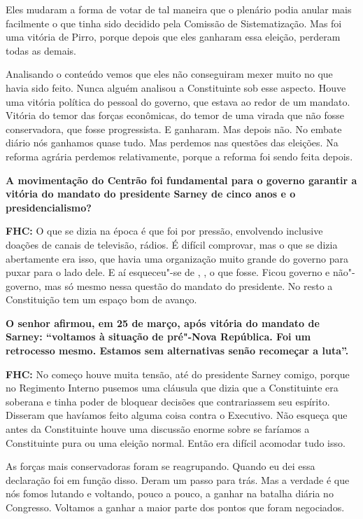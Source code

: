 Eles mudaram a forma de votar de tal maneira que o plenário podia anular
mais facilmente o que tinha sido decidido pela Comissão de
Sistematização. Mas foi uma vitória de Pirro, porque depois que eles
ganharam essa eleição, perderam todas as demais.

Analisando o conteúdo vemos que eles não conseguiram mexer muito no que
havia sido feito. Nunca alguém analisou a Constituinte sob esse aspecto.
Houve uma vitória política do pessoal do governo, que estava ao redor de
um mandato. Vitória do temor das forças econômicas, do temor de uma
virada que não fosse conservadora, que fosse progressista. E ganharam.
Mas depois não. No embate diário nós ganhamos quase tudo. Mas perdemos
nas questões das eleições. Na reforma agrária perdemos relativamente,
porque a reforma foi sendo feita depois.

\textbf{A movimentação do Centrão foi fundamental para o governo
garantir a vitória do mandato do presidente Sarney de cinco anos e o
presidencialismo?}

\textbf{FHC:} O que se dizia na época é que foi por pressão, envolvendo
inclusive doações de canais de televisão, rádios. É difícil comprovar,
mas o que se dizia abertamente era isso, que havia uma organização muito
grande do governo para puxar para o lado dele. E aí esqueceu"-se de ,
, o que fosse. Ficou governo e não"-governo, mas só mesmo nessa
questão do mandato do presidente. No resto a Constituição tem um espaço
bom de avanço.

\textbf{O senhor afirmou, em 25 de março, após vitória do mandato de
Sarney: ``voltamos à situação de pré"-Nova República. Foi um retrocesso
mesmo. Estamos sem alternativas senão recomeçar a luta''.}

\textbf{FHC:} No começo houve muita tensão, até do presidente Sarney
comigo, porque no Regimento Interno pusemos uma cláusula que dizia que a
Constituinte era soberana e tinha poder de bloquear decisões que
contrariassem seu espírito. Disseram que havíamos feito alguma coisa
contra o Executivo. Não esqueça que antes da Constituinte houve uma
discussão enorme sobre se faríamos a Constituinte pura ou uma eleição
normal. Então era difícil acomodar tudo isso.

As forças mais conservadoras foram se reagrupando. Quando eu dei essa
declaração foi em função disso. Deram um passo para trás. Mas a verdade
é que nós fomos lutando e voltando, pouco a pouco, a ganhar na batalha
diária no Congresso. Voltamos a ganhar a maior parte dos pontos que
foram negociados.

